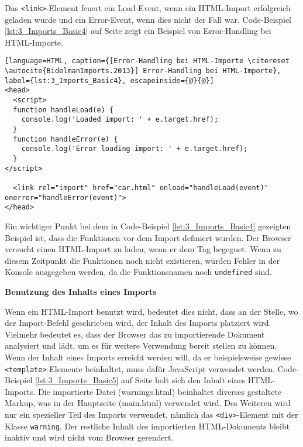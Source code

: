 Das \lstinline|<link>|-Element feuert ein \glqq Load\grqq -Event, wenn ein HTML-Import erfolgreich geladen wurde und ein \glqq Error\grqq -Event, wenn dies nicht der Fall war. Code-Beispiel \ref{lst:3_Imports_Basic4} auf Seite \pageref{lst:3_Imports_Basic4} zeigt ein Beispiel von Error-Handling bei HTML-Importe.

\begin{lstlisting}[language=HTML, caption={[Error-Handling bei HTML-Importe \citereset \autocite{BidelmanImports.2013}] Error-Handling bei HTML-Importe}, label={lst:3_Imports_Basic4}, escapeinside={@}{@}]
<head>
  <script>
  function handleLoad(e) {
    console.log('Loaded import: ' + e.target.href);
  }
  function handleError(e) {
    console.log('Error loading import: ' + e.target.href);
  }
</script>

  <link rel="import" href="car.html" onload="handleLoad(event)" onerror="handleError(event)">
</head>
\end{lstlisting}

Ein wichtiger Punkt bei dem in Code-Beispiel \ref{lst:3_Imports_Basic4} gezeigten Beispiel ist, dass die Funktionen vor dem Import definiert wurden. Der Browser versucht einen HTML-Import zu laden, wenn er dem Tag begegnet. Wenn zu diesem Zeitpunkt die Funktionen noch nicht existieren, würden Fehler in der Konsole ausgegeben werden, da die Funktionsnamen noch \lstinline|undefined| sind.

\textbf{Benutzung des Inhalts eines Imports}

Wenn ein HTML-Import benutzt wird, bedeutet dies nicht, dass an der Stelle, wo der Import-Befehl geschrieben wird, der Inhalt des Imports platziert wird. Vielmehr bedeutet es, dass der Browser das zu importierende Dokument analysiert und lädt, um es für weitere Verwendung bereit stellen zu können. Wenn der Inhalt eines Imports erreicht werden will, da er beispielsweise gewisse \lstinline|<template>|-Elemente beinhaltet, muss dafür JavaScript verwendet werden. Code-Beispiel \ref{lst:3_Imports_Basic5} auf Seite \pageref{lst:3_Imports_Basic5} holt sich den Inhalt eines HTML-Imports. Die importierte Datei (warnings.html) beinhaltet diverses gestaltete Markup, was in der Hauptseite (main.html) verwendet wird. Des Weiteren wird nur ein spezieller Teil des Imports verwendet, nämlich das \lstinline|<div>|-Element mit der Klasse \lstinline|warning|. Der restliche Inhalt des importierten HTML-Dokuments bleibt inaktiv und wird nicht vom Browser gerendert.

